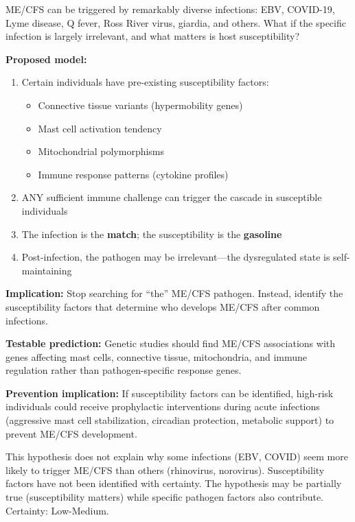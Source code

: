 \begin{hypothesis}
\label{hyp:susceptibility-focus}
ME/CFS can be triggered by remarkably diverse infections: EBV, COVID-19, Lyme disease, Q fever, Ross River virus, giardia, and others. What if the specific infection is largely irrelevant, and what matters is host susceptibility?

\textbf{Proposed model:}
\begin{enumerate}
    \item Certain individuals have pre-existing susceptibility factors:
    \begin{itemize}
        \item Connective tissue variants (hypermobility genes)
        \item Mast cell activation tendency
        \item Mitochondrial polymorphisms
        \item Immune response patterns (cytokine profiles)
    \end{itemize}
    \item ANY sufficient immune challenge can trigger the cascade in susceptible individuals
    \item The infection is the \textbf{match}; the susceptibility is the \textbf{gasoline}
    \item Post-infection, the pathogen may be irrelevant---the dysregulated state is self-maintaining
\end{enumerate}

\textbf{Implication:} Stop searching for ``the'' ME/CFS pathogen. Instead, identify the susceptibility factors that determine who develops ME/CFS after common infections.

\textbf{Testable prediction:} Genetic studies should find ME/CFS associations with genes affecting mast cells, connective tissue, mitochondria, and immune regulation rather than pathogen-specific response genes.

\textbf{Prevention implication:} If susceptibility factors can be identified, high-risk individuals could receive prophylactic interventions during acute infections (aggressive mast cell stabilization, circadian protection, metabolic support) to prevent ME/CFS development.
\end{hypothesis}

\begin{warning}
This hypothesis does not explain why some infections (EBV, COVID) seem more likely to trigger ME/CFS than others (rhinovirus, norovirus). Susceptibility factors have not been identified with certainty. The hypothesis may be partially true (susceptibility matters) while specific pathogen factors also contribute. Certainty: Low-Medium.
\end{warning}

